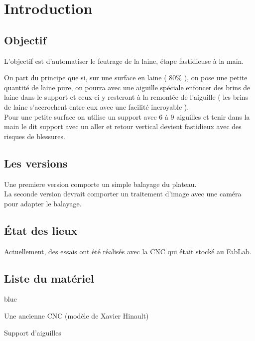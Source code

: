 \chapter{Introduction}

\section{Objectif}

L'objectif est d'automatiser le feutrage de la laine, étape fastidieuse à la main.

On part du principe que si, sur une surface en laine ( 80\% ), on pose une petite quantité de laine pure, on pourra avec une aiguille spéciale enfoncer des brins de laine dans le support et ceux-ci y resteront à la remontée de l’aiguille ( les brins de laine s’accrochent entre eux avec une facilité incroyable ).\\
 Pour une petite surface on utilise un support avec 6 à 9 aiguilles et tenir dans la main le dit support avec un aller et retour vertical devient fastidieux avec des risques de blessures.\\


\section{Les versions}

Une premiere version comporte un simple balayage du plateau.\\
La seconde version devrait comporter un traitement d'image avec une caméra pour adapter le balayage.


\section{État des lieux}

Actuellement, des essais ont été réalisés avec la CNC qui était stocké au FabLab.\\

\section{Liste du matériel}


\begin{items}{blue}{\Triangle}
    \item Une ancienne CNC (modèle de Xavier Hinault)
    \item Support d'aiguilles
\end{items}



